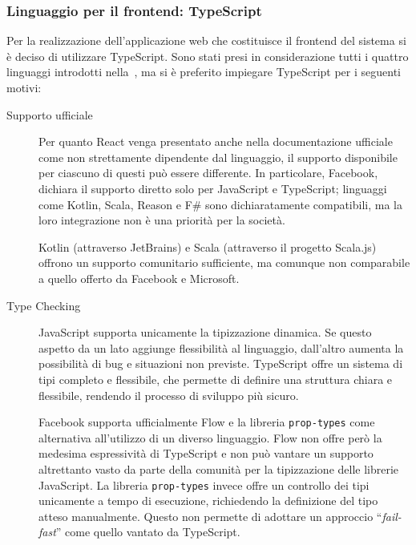       \subsubsection{Linguaggio per il frontend: TypeScript}

        Per la realizzazione dell'applicazione web che costituisce il frontend del sistema si è deciso di utilizzare TypeScript.
        Sono stati presi in considerazione tutti i quattro linguaggi introdotti nella~, ma si è preferito impiegare TypeScript per i seguenti motivi:

        \begin{description}
          \item[Supporto ufficiale]
            Per quanto React venga presentato anche nella documentazione ufficiale~\cite{react-docs} come non strettamente dipendente dal linguaggio, il supporto disponibile per ciascuno di questi può essere differente.
            In particolare, Facebook, dichiara il supporto diretto solo per JavaScript e TypeScript;
            linguaggi come Kotlin, Scala, Reason e F\# sono dichiaratamente compatibili, ma la loro integrazione non è una priorità per la società.

            Kotlin (attraverso JetBrains) e Scala (attraverso il progetto Scala.js) offrono un supporto comunitario sufficiente, ma comunque non comparabile a quello offerto da Facebook e Microsoft.

          \item[Type Checking]
            JavaScript supporta unicamente la tipizzazione dinamica.
            Se questo aspetto da un lato aggiunge flessibilità al linguaggio, dall'altro aumenta la possibilità di bug e situazioni non previste.
            TypeScript offre un sistema di tipi completo e flessibile, che permette di definire una struttura chiara e flessibile, rendendo il processo di sviluppo più sicuro.

            Facebook supporta ufficialmente Flow e la libreria \texttt{prop-types} come alternativa all'utilizzo di un diverso linguaggio.
            Flow non offre però la medesima espressività di TypeScript e non può vantare un supporto altrettanto vasto da parte della comunità per la tipizzazione delle librerie JavaScript.
            La libreria \texttt{prop-types} invece offre un controllo dei tipi unicamente a tempo di esecuzione, richiedendo la definizione del tipo atteso manualmente.
            Questo non permette di adottare un approccio ``\emph{fail-fast}'' come quello vantato da TypeScript.


\end{description}
